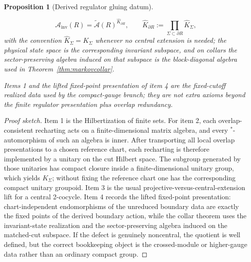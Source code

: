 \documentclass[11pt]{article}
\newtheorem{proposition}[theorem]{Proposition}
\begin{document}
\begin{proposition}[Derived regulator gluing datum]
\begin{enumerate}[leftmargin=2em]
\[
\mathcal A_{\mathrm{inv}}(R)=\widetilde{\mathcal A}(R)^{\widehat K_{\partial R}},
\qquad
\widehat K_{\partial R}:=\prod_{\Sigma\subset\partial R}\widehat K_\Sigma,
\]
\noindent with the convention \(\widehat K_\Sigma=K_\Sigma\) whenever no central extension is needed; the physical state space is the corresponding invariant subspace, and on collars the sector-preserving algebra induced on that subspace is the block-diagonal algebra used in Theorem~\ref{thm:markovcollar}.
\end{enumerate}
Items 1 and the lifted fixed-point presentation of item 4 are the fixed-cutoff realized data used by the compact-gauge branch; they are not extra axioms beyond the finite regulator presentation plus overlap redundancy.
\end{proposition}

\begin{proof}[Proof sketch]
Item 1 is the Hilbertization of finite sets. For item 2, each overlap-consistent recharting acts on a finite-dimensional matrix algebra, and every \(^*\)-automorphism of such an algebra is inner. After transporting all local overlap presentations to a chosen reference chart, each recharting is therefore implemented by a unitary on the cut Hilbert space. The subgroup generated by those unitaries has compact closure inside a finite-dimensional unitary group, which yields \(K_\Sigma\); without fixing the reference chart one has the corresponding compact unitary groupoid. Item 3 is the usual projective-versus-central-extension lift for a central 2-cocycle. Item 4 records the lifted fixed-point presentation: chart-independent endomorphisms of the unreduced boundary data are exactly the fixed points of the derived boundary action, while the collar theorem uses the invariant-state realization and the sector-preserving algebra induced on the matched-cut subspace. If the defect is genuinely noncentral, the quotient is well defined, but the correct bookkeeping object is the crossed-module or higher-gauge data rather than an ordinary compact group.
\end{proof}
\end{document}
